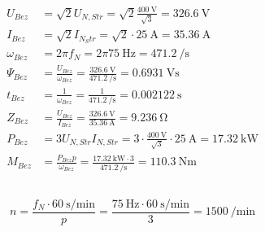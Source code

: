 \documentclass[11pt,a4paper]{scrartcl}
\newcommand{\0}{_{\mybr{0}}}
\newcommand{\1}{_{\mybr{1}}}
\newcommand{\2}{_{\mybr{2}}}
\begin{document}
\subsection{}
\begin{align}
U_{Bez}&=\sqrt{2}U_{N,Str}=\sqrt{2}\frac{\SI{400}{\volt}}{\sqrt{3}}=\SI{326.6}{\volt}\\
I_{Bez}&=\sqrt{2}I_{N_Str}=\sqrt{2}\cdot\SI{25}\ampere=\SI{35.36}{\ampere}\\
\omega_{Bez}&=2\pi f_N=2 \pi \SI{75}{\hertz}=\SI{471.2}{\per\second}\\
\Psi_{Bez}&=\frac{U_{Bez}}{\omega_{Bez}}=\frac{\SI{326.6}{\volt}}{\SI{471.2}{\per\second}}=\SI{0.6931}{\volt\second}\\
t_{Bez}&=\frac{1}{\omega_{Bez}}=\frac{1}{\SI{471.2}{\per\second}}=\SI{0.002122}{\second}\\
Z_{Bez}&=\frac{U_{Bez}}{I_{Bez}}=\frac{\SI{326.6}{\volt}}{\SI{35.36}{\ampere}}=\SI{9.236}{\ohm}\\
P_{Bez}&=3U_{N,Str}I_{N,Str}=3\cdot\frac{\SI{400}{\volt}}{\sqrt{3}}\cdot\SI{25}{\ampere}=\SI{17.32}{\kilo\watt}\\
M_{Bez}&=\frac{P_{Bez}p}{\omega_{Bez}}=\frac{\SI{17.32}{\kilo\watt}\cdot 3}{\SI{471.2}{\per\second}}=\SI{110.3}{\newton\metre}
\end{align}

\subsection{}
\begin{equation}
n=\frac{f_N\cdot\SI{60}{\second\per\minute}}{p}=\frac{\SI{75}{\hertz}\cdot\SI{60}{\second\per\minute}}{3}=\SI{1500}{\per\minute}
\end{equation}
\end{document}
